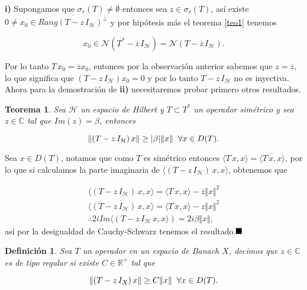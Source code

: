 \documentclass[letterpaper]{report}
\newtheorem{teorema}{Teorema}[chapter]
\newtheorem{def.}{Definici\'on}[chapter]
\newcommand{\co}{\ensuremath{\mathbb C }}
\newcommand{\hil}{\ensuremath{\mathcal H }}
\newcommand{\re}{\ensuremath{\mathbb R }}
\newcommand{\nuc}{\ensuremath{\mathcal{N}}}
\newcommand{\qed}{\ensuremath{\hspace*{0em plus 1fill}\blacksquare}}
\begin{document}
\begin{dem}
\textbf{i)} Supongamos que $\sigma_r(T)\neq\emptyset$ entonces sea $z\in\sigma_r(T)$, así existe \hbox{$0\neq x_0\in\overline{Rang(T-z\,I_{\hil})^{\bot}}$} y por hipótesis más el teorema \ref{teo1} tenemos

$$
x_0\in\nuc(T^*-\overline{z}\,I_{\hil})=
\nuc(T-\overline{z}\,I_{\hil}).
$$

Por lo tanto $T\,x_0=\overline{z}x_0$, entonces por la observación anterior sabemos que $z=\overline{z}$, lo que significa que \hbox{$(T-z\,I_{\hil})x_0=0$} y por lo tanto $T-z\,I_{\hil}$ no es inyectiva. Ahora para la demostración de \textbf{ii)} necesitaremos  probar primero otros resultados.
\end{dem}

\begin{teorema}\label{reg}
Sea $\hil$ un espacio de Hilbert y $T\subset T^*$ un operador simétrico y sea $z\in\co$ tal que \hbox{$Im(z)=\beta$}, entonces

$$
\Vert(T-z\,I_{\hil})\,x\Vert\geq\vert\beta\vert\Vert x\Vert
\hspace{0.2cm}\forall x\in D(T).
$$
\end{teorema}

\begin{dem}
Sea $x\in D(T)$, notamos que como $T$ es simétrico entonces \hbox{$\langle T\,x,x\rangle=\overline{\langle T\,x,x\rangle}$}, por lo que si calculamos la parte imaginaria de \hbox{$\langle(T-z\,I_{\hil})\,x,x\rangle$}, obtenemos que 

\begin{align}
\langle(T-z\,I_{\hil})\,x,x\rangle=\langle T\,x,x\rangle-\overline{z}\Vert x\Vert^2\\
\overline{\langle(T-z\,I_{\hil})\,x,x\rangle}=\langle T\,x,x\rangle-z\Vert x\Vert^2\\
\therefore 2iIm\langle(T-z\,I_{\hil}\,x,x\rangle)=2i\beta\Vert x\Vert,
\end{align}
así por la desigualdad de Cauchy-Schwarz tenemos el resultado.\qed
\end{dem}

\begin{def.}
Sea $T$ un operador en un espacio de Banach $X$, decimos que $z\in\co$ es de tipo regular si existe $C\in\re^+$ tal que

$$
\Vert(T-z\,I_X)\,x\Vert\geq C\Vert x\Vert
\hspace{0.2cm}\forall x\in D(T).
$$
\end{def.}
\end{document}
